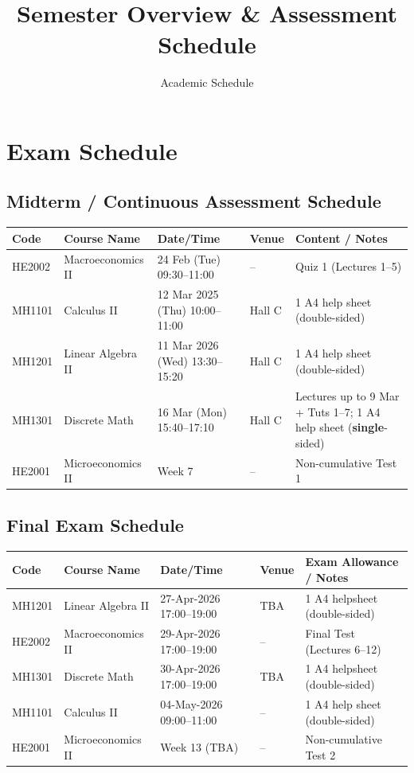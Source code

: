 \documentclass[a4paper,11pt]{article}
\title{Semester Overview \& Assessment Schedule}
\author{Academic Schedule}
\date{}
\begin{document}
\maketitle


\section{Exam Schedule}

\subsection*{Midterm / Continuous Assessment Schedule}
\begin{center}
\renewcommand{\arraystretch}{1.4}
\begin{tabularx}{\textwidth}{@{}l l l l X@{}}
\toprule
\textbf{Code} & \textbf{Course Name} & \textbf{Date/Time} & \textbf{Venue} & \textbf{Content / Notes} \\
\midrule
HE2002 & Macroeconomics II & 24 Feb (Tue) 09:30--11:00 & -- & Quiz 1 (Lectures 1--5) \\
MH1101 & Calculus II & 12 Mar 2025 (Thu) 10:00--11:00 & Hall C & 1 A4 help sheet (double-sided)  \\
MH1201 & Linear Algebra II & 11 Mar 2026 (Wed) 13:30--15:20 & Hall C & 1 A4 help sheet (double-sided)  \\
MH1301 & Discrete Math & 16 Mar (Mon) 15:40--17:10 & Hall C & Lectures up to 9 Mar + Tuts 1--7; 1 A4 help sheet (\textbf{single}-sided)  \\
HE2001 & Microeconomics II & Week 7 & -- & Non-cumulative Test 1 \\
\bottomrule
\end{tabularx}
\end{center}

\subsection*{Final Exam Schedule}
\begin{center}
\renewcommand{\arraystretch}{1.4}
\begin{tabularx}{\textwidth}{@{}l l l l X@{}}
\toprule
\textbf{Code} & \textbf{Course Name} & \textbf{Date/Time} & \textbf{Venue} & \textbf{Exam Allowance / Notes} \\
\midrule
MH1201 & Linear Algebra II & 27-Apr-2026 17:00--19:00 & TBA & 1 A4 helpsheet (double-sided) \\
HE2002 & Macroeconomics II & 29-Apr-2026 17:00--19:00 & -- & Final Test (Lectures 6--12) \\
MH1301 & Discrete Math & 30-Apr-2026 17:00--19:00 & TBA & 1 A4 helpsheet (double-sided) \\
MH1101 & Calculus II & 04-May-2026 09:00--11:00 & -- & 1 A4 help sheet (double-sided) \\
HE2001 & Microeconomics II & Week 13 (TBA) & -- & Non-cumulative Test 2 \\
\bottomrule
\end{tabularx}
\end{center}
\end{document}
